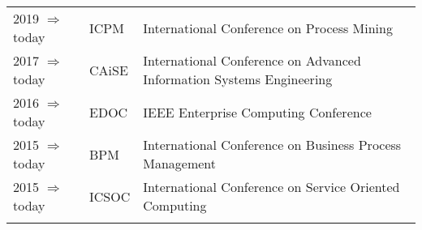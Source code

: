 \vspace{0.5cm}
\vspace{0.3cm}

\raggedright
\begin{tabular}{P{2.5cm}P{2cm}P{11cm}}
2019 $\Rightarrow$ today		& ICPM 	& International Conference on Process Mining \\\noalign{\smallskip}
2017 $\Rightarrow$ today		& CAiSE	& International Conference on Advanced Information Systems Engineering \\\noalign{\smallskip}
2016 $\Rightarrow$  today		& EDOC	& IEEE Enterprise Computing Conference\\\noalign{\smallskip}
2015 $\Rightarrow$ today		& BPM		& International Conference  on Business Process Management\\\noalign{\smallskip}
2015 $\Rightarrow$  today		& ICSOC	& International Conference  on Service Oriented Computing\\\noalign{\smallskip}
\end{tabular}

\pagebreak
\vspace{0.5cm}
\vspace{0.3cm}


